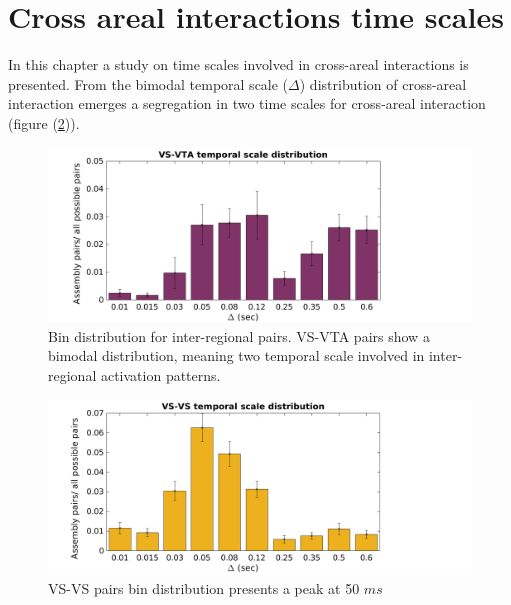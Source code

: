 \section{Cross areal interactions time scales}
In this chapter a study on time scales involved in cross-areal interactions is presented. From the bimodal temporal scale ($\Delta$) distribution of cross-areal interaction emerges a segregation in two time scales for cross-areal interaction (figure (\ref{fig:BinDistr})).
\begin{figure}[H]
\includegraphics[scale=0.45]{figures/VS_VTA_Short1.png}
\caption{Bin distribution for inter-regional pairs. VS-VTA pairs show a bimodal distribution, meaning two temporal scale involved in inter-regional activation patterns.%
}
\label{fig:BinDistr}
\end{figure}
\begin{figure}[H]
\includegraphics[scale=0.45]{figures/VS_VS_S.png}
\caption{VS-VS pairs bin distribution presents a peak at 50 $ms$}
\label{fig:BinDistr}
\end{figure}

